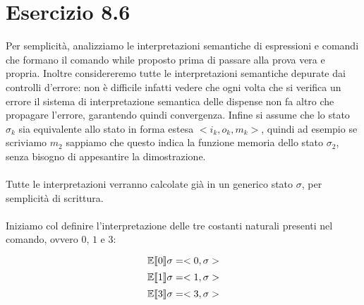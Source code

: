 \section*{Esercizio 8.6}

    
    Per semplicità, analizziamo le interpretazioni semantiche di espressioni e comandi che formano il comando while proposto prima di passare alla prova vera e propria. Inoltre considereremo tutte le interpretazioni semantiche depurate dai controlli d'errore: non è difficile infatti vedere che ogni volta che si verifica un errore il sistema di interpretazione semantica delle dispense non fa altro che propagare l'errore, garantendo quindi convergenza. Infine si assume che lo stato $\sigma_k$ sia equivalente allo stato in forma estesa $<i_k, o_k, m_k>$, quindi ad esempio se scriviamo $m_2$ sappiamo che questo indica la funzione memoria dello stato $\sigma_2$, senza bisogno di appesantire la dimostrazione.\\
    \\
    Tutte le interpretazioni verranno calcolate già in un generico stato $\sigma$, per semplicità di scrittura.\\
    \\
    Iniziamo col definire l'interpretazione delle tre costanti naturali presenti nel comando, ovvero $0$, $1$ e $3$:
    
    \begin{equation*}
        \mathbb{E}\llbracket 0 \rrbracket\sigma = <0, \sigma>
    \end{equation*}
    \begin{equation*}
        \mathbb{E}\llbracket 1 \rrbracket\sigma = <1, \sigma>
    \end{equation*}
    \begin{equation*}
        \mathbb{E}\llbracket 3 \rrbracket\sigma = <3, \sigma>
    \end{equation*}
    
